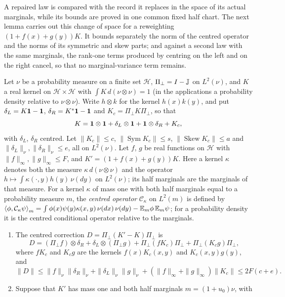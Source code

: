 A repaired law is compared with the record it replaces in the space of
its actual marginals, while its bounds are proved in one common fixed
half chart. The next lemma carries out this change of space for a
reweighting $(1+f(x)+g(y))K$. It bounds separately the norm of the centred operator and
the norms of its symmetric and skew parts; and against a second law with the same
marginals, the rank-one terms produced by centring on the left and
on the right cancel, so that no marginal-variance term remains.

\begin{lemma}\label{lem:record:centered-correction}
Let $\nu$ be a probability measure on a finite set $\mathcal H$,
$\Pi_\perp=I-\mathbb J$ on $L^2(\nu)$, and $K$ a real kernel on
$\mathcal H\times\mathcal H$ with $\int K\,d(\nu\otimes\nu)=1$ (in the applications
a probability density relative to $\nu\otimes\nu$). Write $h\otimes k$ for the
kernel $h(x)k(y)$, and put $\delta_L=K\mathbf 1-\mathbf 1$, $\delta_R=K^*\mathbf 1-\mathbf 1$ and
$K_c=\Pi_\perp K\Pi_\perp$, so that
\[
 K=\mathbf 1\otimes\mathbf 1+\delta_L\otimes\mathbf 1+\mathbf 1\otimes\delta_R+K_c ,
\]
with $\delta_L$, $\delta_R$ centred. Let $\|K_c\|\le c$,
$\|\operatorname{Sym}K_c\|\le s$, $\|\operatorname{Skew}K_c\|\le a$ and
$\|\delta_L\|_\nu,\|\delta_R\|_\nu\le e$, all on $L^2(\nu)$. Let $f$, $g$ be real
functions on $\mathcal H$ with $\|f\|_\infty,\|g\|_\infty\le F$, and
$K'=(1+f(x)+g(y))K$. Here a kernel $\kappa$ denotes both the
measure $\kappa\,d(\nu\otimes\nu)$ and the operator
$h\mapsto\int\kappa(\cdot,y)h(y)\,\nu(dy)$ on $L^2(\nu)$; its half
marginals are the marginals of that measure. For a kernel $\kappa$ of
mass one with both half marginals
equal to a probability measure $m$, the \emph{centred operator} $\mathcal C_\kappa$
on $L^2(m)$ is defined by
$\left\langle \phi,\mathcal C_\kappa\psi\right\rangle_m=\int\phi(x)\psi(y)\kappa(x,y)\,\nu(dx)\,\nu(dy)
-\mathbb E_m\phi\,\mathbb E_m\psi$; for a probability density it is the centred conditional
operator relative to the marginals.
\begin{enumerate}[label=\textup{(\alph*)}]
\item The centred correction $D=\Pi_\perp(K'-K)\Pi_\perp$ is
 \[
  D=(\Pi_\perp f)\otimes\delta_R+\delta_L\otimes(\Pi_\perp g)
  +\Pi_\perp(fK_c)\Pi_\perp+\Pi_\perp(K_cg)\Pi_\perp ,
 \]
 where $fK_c$ and $K_cg$ are the kernels $f(x)K_c(x,y)$ and $K_c(x,y)g(y)$, and
 \[
  \|D\|\le\|f\|_\nu\|\delta_R\|_\nu+\|\delta_L\|_\nu\|g\|_\nu
  +(\|f\|_\infty+\|g\|_\infty)\|K_c\|\le2F(c+e).
 \]
\item Suppose that $K'$ has mass one and both half marginals $m=(1+u_0)\nu$, with

\end{enumerate}
\end{lemma}
